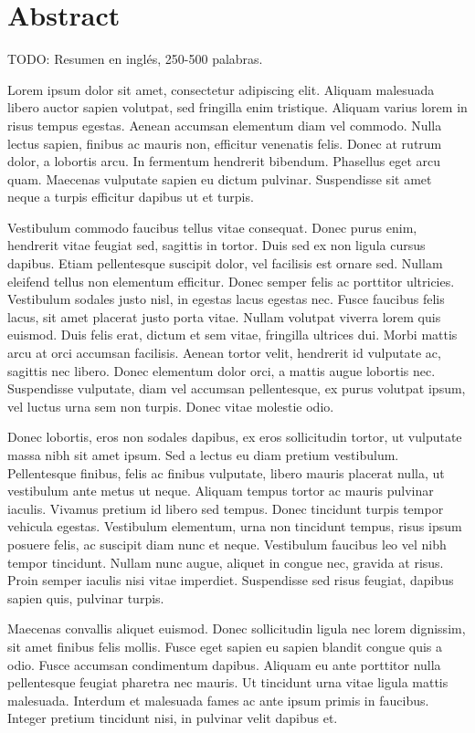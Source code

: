 \chapter*{Abstract}

\begin{abstractEn}
TODO: Resumen en inglés, 250-500 palabras.

Lorem ipsum dolor sit amet, consectetur adipiscing elit. Aliquam malesuada libero auctor sapien volutpat, sed fringilla enim tristique. Aliquam varius lorem in risus tempus egestas. Aenean accumsan elementum diam vel commodo. Nulla lectus sapien, finibus ac mauris non, efficitur venenatis felis. Donec at rutrum dolor, a lobortis arcu. In fermentum hendrerit bibendum. Phasellus eget arcu quam. Maecenas vulputate sapien eu dictum pulvinar. Suspendisse sit amet neque a turpis efficitur dapibus ut et turpis.

Vestibulum commodo faucibus tellus vitae consequat. Donec purus enim, hendrerit vitae feugiat sed, sagittis in tortor. Duis sed ex non ligula cursus dapibus. Etiam pellentesque suscipit dolor, vel facilisis est ornare sed. Nullam eleifend tellus non elementum efficitur. Donec semper felis ac porttitor ultricies. Vestibulum sodales justo nisl, in egestas lacus egestas nec. Fusce faucibus felis lacus, sit amet placerat justo porta vitae. Nullam volutpat viverra lorem quis euismod. Duis felis erat, dictum et sem vitae, fringilla ultrices dui. Morbi mattis arcu at orci accumsan facilisis. Aenean tortor velit, hendrerit id vulputate ac, sagittis nec libero. Donec elementum dolor orci, a mattis augue lobortis nec. Suspendisse vulputate, diam vel accumsan pellentesque, ex purus volutpat ipsum, vel luctus urna sem non turpis. Donec vitae molestie odio.

Donec lobortis, eros non sodales dapibus, ex eros sollicitudin tortor, ut vulputate massa nibh sit amet ipsum. Sed a lectus eu diam pretium vestibulum. Pellentesque finibus, felis ac finibus vulputate, libero mauris placerat nulla, ut vestibulum ante metus ut neque. Aliquam tempus tortor ac mauris pulvinar iaculis. Vivamus pretium id libero sed tempus. Donec tincidunt turpis tempor vehicula egestas. Vestibulum elementum, urna non tincidunt tempus, risus ipsum posuere felis, ac suscipit diam nunc et neque. Vestibulum faucibus leo vel nibh tempor tincidunt. Nullam nunc augue, aliquet in congue nec, gravida at risus. Proin semper iaculis nisi vitae imperdiet. Suspendisse sed risus feugiat, dapibus sapien quis, pulvinar turpis.

Maecenas convallis aliquet euismod. Donec sollicitudin ligula nec lorem dignissim, sit amet finibus felis mollis. Fusce eget sapien eu sapien blandit congue quis a odio. Fusce accumsan condimentum dapibus. Aliquam eu ante porttitor nulla pellentesque feugiat pharetra nec mauris. Ut tincidunt urna vitae ligula mattis malesuada. Interdum et malesuada fames ac ante ipsum primis in faucibus. Integer pretium tincidunt nisi, in pulvinar velit dapibus et.
\end{abstractEn}

